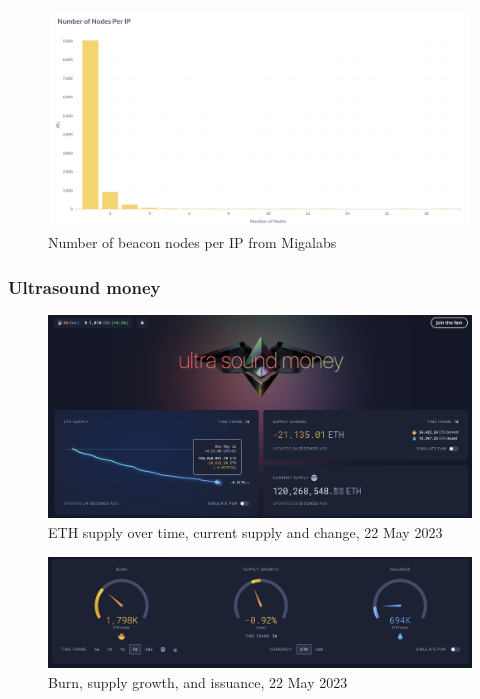 \documentclass[UTF8]{article}
\begin{document}
\begin{figure}[htbp]
\begin{center}
\includegraphics[width=0.48\linewidth]{images/ipdist}
\caption{Number of beacon nodes per IP from Migalabs }
\label{fig:ipdist}
\end{center}
\end{figure}
\clearpage
\subsubsection*{Ultrasound money}

\begin{figure}[htbp]
\begin{center}
\includegraphics[width=0.9\linewidth]{images/ethsupply}
\caption{ETH supply over time, current supply and change, 22 May 2023}
\label{fig:ethsupply}
\end{center}
\end{figure}

\begin{figure}[htbp]
\begin{center}
\includegraphics[width=0.9\linewidth]{images/burn}
\caption{Burn, supply growth, and issuance, 22 May 2023}
\label{fig:burn}
\end{center}
\end{figure}
\end{document}
